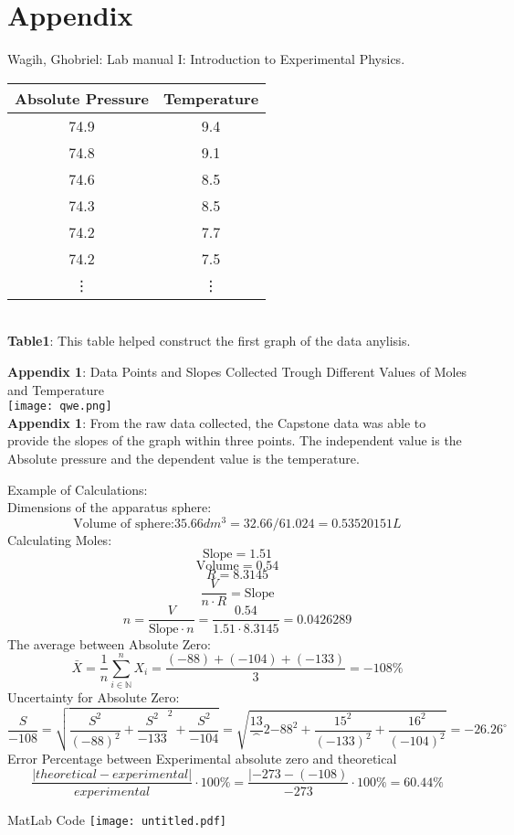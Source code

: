 \documentclass[11pt]{article}
\def\N{{\mathbb{N}}}
\begin{document}
\section*{Appendix}
Wagih, Ghobriel: Lab manual I: Introduction to Experimental Physics.
\begin{table}[h!]
\centering
 \begin{tabular}{||c c||} 
 \hline
 Absolute Pressure & Temperature \\ [0.5ex] 
 \hline\hline
     74.9 & 9.4  \\
     74.8 & 9.1  \\
     74.6 & 8.5  \\
     74.3 & 8.5  \\
     74.2 & 7.7  \\
     74.2 & 7.5  \\
     \vdots & \vdots 
 \end{tabular}
\end{table}
\\\small\textbf{Table1}: This table helped construct the first graph of the data anylisis. \\
\begin{center}
    \textbf{Appendix 1}: Data Points and Slopes Collected Trough Different Values of Moles and Temperature \\
    \texttt{[image: qwe.png]}\\\textbf{Appendix 1}: From the raw data collected, the Capstone data was able to provide the slopes of the graph within three points. The independent value is the Absolute pressure and the dependent value is the temperature. 
\end{center}
Example of Calculations:\\
Dimensions of the apparatus sphere:
\[\text{Volume of sphere:} 35.66dm^3=32.66/61.024=0.53520151 L\]
Calculating Moles:
\[\text{Slope}=1.51\]\[\text{Volume}=0.54\]\[R=8.3145\]\[\frac{V}{n\cdot R}=\text{Slope}\]
\[n=\frac{V}{\text{Slope}\cdot n}=\frac{0.54}{1.51\cdot 8.3145}=0.0426289\]
The average between Absolute Zero:
\[\bar X= \frac{1}{n}\sum^n_{i\in\N}X_i=\frac{(-88)+(-104)+(-133)}{3}=-108 \%\]
Uncertainty for Absolute Zero:
 \[\frac{S}{-108}=\sqrt{\frac{S^2}{(-88)^2}+\frac{S^2}{-133}^2+\frac{S^2}{-104}}=\sqrt{\frac{13}^2{-88}^2+\frac{15^2}{(-133)^2}+\frac{16^2}{(-104)^2}}=-26.26^\circ\]
 Error Percentage between Experimental absolute zero and theoretical
 \[\frac{|theoretical-experimental|}{experimental}\cdot 100\% =\frac{|-273-(-108)}{-273}\cdot 100\%=60.44\%\]
 \newpage
 \begin{center}
 MatLab Code
     \texttt{[image: untitled.pdf]}
 \end{center}
\end{document}
